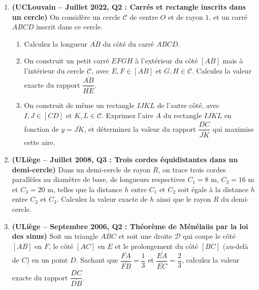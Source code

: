 \begin{enumerate}[label=\textbf{Exercice 4.\arabic* --}, align=left, leftmargin=*]
    \item \textbf{(UCLouvain -- Juillet 2022, Q2 : Carrés et rectangle inscrits dans un cercle)} On considère un cercle $\mathcal{C}$ de centre $O$ et de rayon $1$, et un carré $ABCD$ inscrit dans ce cercle.
    \begin{enumerate}
        \item Calculez la longueur $\overline{AB}$ du côté du carré $ABCD$.
        \item On construit un petit carré $EFGH$ à l'extérieur du côté $[AB]$ mais à l'intérieur du cercle $\mathcal{C}$, avec $E, F \in [AB]$ et $G, H \in \mathcal{C}$. Calculez la valeur exacte du rapport $\dfrac{\overline{AB}}{\overline{HE}}$.
        \item On construit de même un rectangle $IJKL$ de l'autre côté, avec $I, J \in [CD]$ et $K, L \in \mathcal{C}$. Exprimez l'aire $A$ du rectangle $IJKL$ en fonction de $y = \overline{JK}$, et déterminez la valeur du rapport $\dfrac{\overline{DC}}{\overline{JK}}$ qui maximise cette aire.
    \end{enumerate}

    \item \textbf{(ULiège -- Juillet 2008, Q3 : Trois cordes équidistantes dans un demi-cercle)} Dans un demi-cercle de rayon $R$, on trace trois cordes parallèles au diamètre de base, de longueurs respectives $C_1 = 8\text{ m}$, $C_2 = 16\text{ m}$ et $C_3 = 20\text{ m}$, telles que la distance $h$ entre $C_1$ et $C_2$ soit égale à la distance $h$ entre $C_2$ et $C_3$. Calculez la valeur exacte de $h$ ainsi que le rayon $R$ du demi-cercle.

    \item \textbf{(ULiège -- Septembre 2006, Q2 : Théorème de Ménélaüs par la loi des sinus)} Soit un triangle $ABC$ et soit une droite $\mathcal{D}$ qui coupe le côté $[AB]$ en $F$, le côté $[AC]$ en $E$ et le prolongement du côté $[BC]$ (au-delà de $C$) en un point $D$. Sachant que $\dfrac{\overline{FA}}{\overline{FB}} = \dfrac{1}{3}$ et $\dfrac{\overline{EA}}{\overline{EC}} = \dfrac{2}{3}$, calculez la valeur exacte du rapport $\dfrac{\overline{DC}}{\overline{DB}}$.
\end{enumerate}
